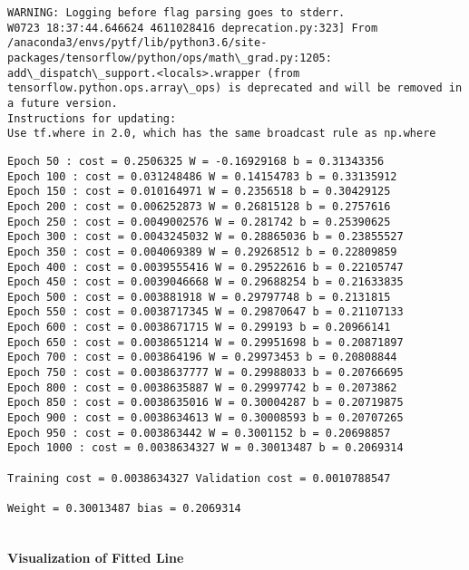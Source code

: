 \documentclass[11pt]{article}
\begin{document}
    \begin{Verbatim}[commandchars=\\\{\}]
WARNING: Logging before flag parsing goes to stderr.
W0723 18:37:44.646624 4611028416 deprecation.py:323] From /anaconda3/envs/pytf/lib/python3.6/site-packages/tensorflow/python/ops/math\_grad.py:1205: add\_dispatch\_support.<locals>.wrapper (from tensorflow.python.ops.array\_ops) is deprecated and will be removed in a future version.
Instructions for updating:
Use tf.where in 2.0, which has the same broadcast rule as np.where

    \end{Verbatim}

    \begin{Verbatim}[commandchars=\\\{\}]
Epoch 50 : cost = 0.2506325 W = -0.16929168 b = 0.31343356
Epoch 100 : cost = 0.031248486 W = 0.14154783 b = 0.33135912
Epoch 150 : cost = 0.010164971 W = 0.2356518 b = 0.30429125
Epoch 200 : cost = 0.006252873 W = 0.26815128 b = 0.2757616
Epoch 250 : cost = 0.0049002576 W = 0.281742 b = 0.25390625
Epoch 300 : cost = 0.0043245032 W = 0.28865036 b = 0.23855527
Epoch 350 : cost = 0.004069389 W = 0.29268512 b = 0.22809859
Epoch 400 : cost = 0.0039555416 W = 0.29522616 b = 0.22105747
Epoch 450 : cost = 0.0039046668 W = 0.29688254 b = 0.21633835
Epoch 500 : cost = 0.003881918 W = 0.29797748 b = 0.2131815
Epoch 550 : cost = 0.0038717345 W = 0.29870647 b = 0.21107133
Epoch 600 : cost = 0.0038671715 W = 0.299193 b = 0.20966141
Epoch 650 : cost = 0.0038651214 W = 0.29951698 b = 0.20871897
Epoch 700 : cost = 0.003864196 W = 0.29973453 b = 0.20808844
Epoch 750 : cost = 0.0038637777 W = 0.29988033 b = 0.20766695
Epoch 800 : cost = 0.0038635887 W = 0.29997742 b = 0.2073862
Epoch 850 : cost = 0.0038635016 W = 0.30004287 b = 0.20719875
Epoch 900 : cost = 0.0038634613 W = 0.30008593 b = 0.20707265
Epoch 950 : cost = 0.003863442 W = 0.3001152 b = 0.20698857
Epoch 1000 : cost = 0.0038634327 W = 0.30013487 b = 0.2069314

Training cost = 0.0038634327 Validation cost = 0.0010788547 

Weight = 0.30013487 bias = 0.2069314 


    \end{Verbatim}

    \hypertarget{visualization-of-fitted-line}{%
\paragraph{Visualization of Fitted
Line}\label{visualization-of-fitted-line}}
\end{document}
